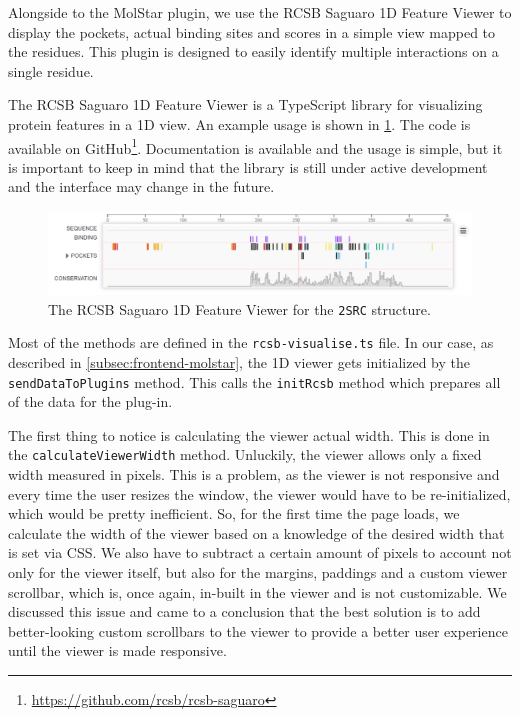 Alongside to the MolStar plugin, we use the RCSB Saguaro 1D Feature Viewer to display the pockets, actual binding sites and scores in a simple view mapped to the residues. This plugin is designed to easily identify multiple interactions on a single residue.

The RCSB Saguaro 1D Feature Viewer is a TypeScript library for visualizing protein features in a 1D view. An example usage is shown in \cref{fig:1d-viewer}. The code is available on GitHub\footnote{\url{https://github.com/rcsb/rcsb-saguaro}}. Documentation is available and the usage is simple, but it is important to keep in mind that the library is still under active development and the interface may change in the future.

\begin{figure}[htb]
    \centering
    \includegraphics[width=\linewidth]{img/rcsb_2src.pdf}
    \caption{The RCSB Saguaro 1D Feature Viewer for the \texttt{2SRC} structure.}
    \label{fig:1d-viewer}
\end{figure}

Most of the methods are defined in the \texttt{rcsb-visualise.ts} file. In our case, as described in \cref{subsec:frontend-molstar}, the 1D viewer gets initialized by the \texttt{sendDataToPlugins} method. This calls the \texttt{initRcsb} method which prepares all of the data for the plug-in.

The first thing to notice is calculating the viewer actual width. This is done in the \texttt{calculateViewerWidth} method. Unluckily, the viewer allows only a fixed width measured in pixels. This is a problem, as the viewer is not responsive and every time the user resizes the window, the viewer would have to be re-initialized, which would be pretty inefficient. So, for the first time the page loads, we calculate the width of the viewer based on a knowledge of the desired width that is set via CSS. We also have to subtract a certain amount of pixels to account not only for the viewer itself, but also for the margins, paddings and a custom viewer scrollbar, which is, once again, in-built in the viewer and is not customizable. We discussed this issue and came to a conclusion that the best solution is to add better-looking custom scrollbars to the viewer to provide a better user experience until the viewer is made responsive.

